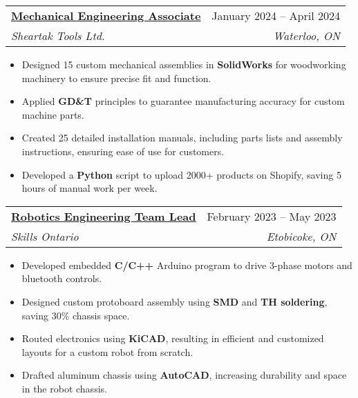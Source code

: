 \documentclass[letterpaper]{article}
\makeatletter
\newcommand{\resumeItem}[1]{
  \item\small{
    {#1 \vspace{-2pt}}
  }
}
\newcommand{\resumeSubheading}[4]{
  \vspace{-2pt}\item
    \begin{tabular*}{0.97\textwidth}[t]{l@{\extracolsep{\fill}}r}
      \textbf{#1} & #2 \\
      \textit{\small#3} & \textit{\small #4} \\
    \end{tabular*}\vspace{-7pt}
}
\newcommand{\resumeItemListStart}{\begin{itemize}}
\newcommand{\resumeItemListEnd}{\end{itemize}\vspace{-5pt}}
\makeatother
\begin{document}

\resumeSubheading
{\href{https://www.gavintranquilino.com/sheartak.html}{\underline{Mechanical Engineering Associate}}}{January 2024 -- April 2024}
{Sheartak Tools Ltd.}{Waterloo, ON}
\resumeItemListStart
\resumeItem{Designed 15 custom mechanical assemblies in \textbf{SolidWorks} for woodworking machinery to ensure precise fit and function.}
\resumeItem{Applied \textbf{GD\&T} principles to guarantee manufacturing accuracy for custom machine parts.}
\resumeItem{Created 25 detailed installation manuals, including parts lists and assembly instructions, ensuring ease of use for customers.}
\resumeItem{Developed a \textbf{Python} script to upload 2000+ products on Shopify, saving 5 hours of manual work per week.}
\resumeItemListEnd


\resumeSubheading
{\href{https://www.gavintranquilino.com/hockey-robot.html}{\underline{Robotics Engineering Team Lead}}}{February 2023 -- May 2023}
{Skills Ontario}{Etobicoke, ON}
\resumeItemListStart
\resumeItem{Developed embedded \textbf{C/C++} Arduino program to drive 3-phase motors and bluetooth controls.}
\resumeItem{Designed custom protoboard assembly using \textbf{SMD} and \textbf{TH soldering}, saving 30\% chassis space.}
\resumeItem{Routed electronics using \textbf{KiCAD}, resulting in efficient and customized layouts for a custom robot from scratch.}
\resumeItem{Drafted aluminum chassis using \textbf{AutoCAD}, increasing durability and space in the robot chassis.}
\resumeItemListEnd
\end{document}
